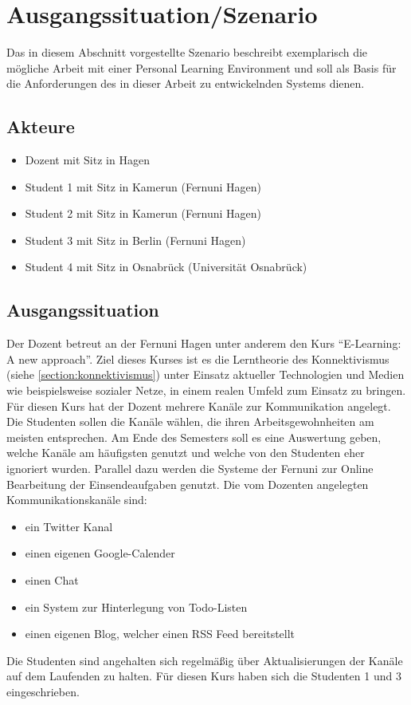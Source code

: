 \section{Ausgangssituation/Szenario}
Das in diesem Abschnitt vorgestellte Szenario beschreibt exemplarisch die mögliche Arbeit mit einer Personal Learning Environment und soll als Basis für die Anforderungen des in dieser Arbeit zu entwickelnden Systems dienen.

\subsection{Akteure}
\begin{itemize}
 \item Dozent mit Sitz in Hagen
 \item Student 1 mit Sitz in Kamerun (Fernuni Hagen)
 \item Student 2 mit Sitz in Kamerun (Fernuni Hagen)
 \item Student 3 mit Sitz in Berlin (Fernuni Hagen)
 \item Student 4 mit Sitz in Osnabrück (Universität Osnabrück) 
\end{itemize}

\subsection{Ausgangssituation}\label{section:ausgangssituation}
Der Dozent betreut an der Fernuni Hagen unter anderem den Kurs "`E-Learning: A new approach"'. Ziel dieses Kurses ist es die Lerntheorie des Konnektivismus (siehe \ref{section:konnektivismus}) unter Einsatz aktueller Technologien und Medien wie beispielsweise sozialer Netze, in einem realen Umfeld zum Einsatz zu bringen.  Für diesen Kurs hat der Dozent mehrere Kanäle zur Kommunikation angelegt. Die Studenten sollen die Kanäle wählen, die ihren Arbeitsgewohnheiten am meisten entsprechen. Am Ende des Semesters soll es eine Auswertung geben, welche Kanäle am häufigsten genutzt und welche von den Studenten eher ignoriert wurden. Parallel dazu werden die Systeme der Fernuni zur Online Bearbeitung der Einsendeaufgaben genutzt. Die vom Dozenten angelegten Kommunikationskanäle sind:
\begin{itemize}
 \item ein Twitter Kanal
 \item einen eigenen Google-Calender
 \item einen Chat
 \item ein System zur Hinterlegung von Todo-Listen
 \item einen eigenen Blog, welcher einen RSS Feed bereitstellt 
\end{itemize}
Die Studenten sind angehalten sich regelmäßig über Aktualisierungen der Kanäle auf dem Laufenden zu halten. Für diesen Kurs haben sich die Studenten 1 und 3 eingeschrieben.

